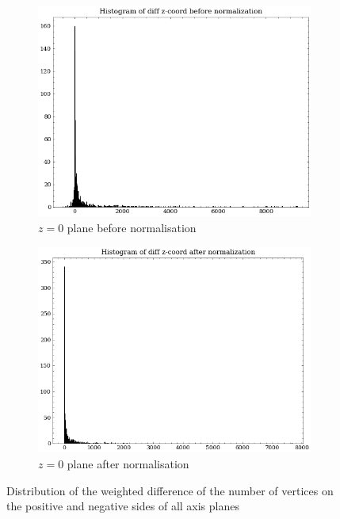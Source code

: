 \begin{figure}[H]
\vspace{1cm}
    \begin{subfigure}[b]{0.45\textwidth}
        \centering
        \includegraphics[width=\textwidth]{assets/preprocessing/Histogram_of_diff_z-coord_before_normalization.png}
        \caption{$z=0$ plane before normalisation}
        \label{fig:resampling-flipping-z-before}
    \end{subfigure}
    \hfill
    \begin{subfigure}[b]{0.45\textwidth}
        \centering
        \includegraphics[width=\textwidth]{assets/preprocessing/Histogram_of_diff_z-coord_after_normalization.png}
        \caption{$z=0$ plane after normalisation}
        \label{fig:resampling-flipping-z-after}
    \end{subfigure}
    \caption{Distribution of the weighted difference of the number of vertices on the positive and negative sides of all axis planes}
    \label{fig:resampling-flipping}
\end{figure}


